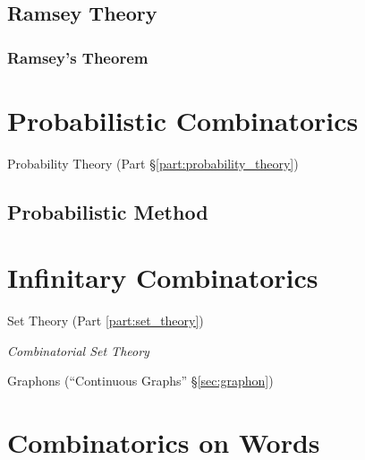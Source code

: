 \subsection{Ramsey Theory}\label{sec:ramsey_theory}

\subsubsection{Ramsey's Theorem}\label{sec:ramseys_theorem}



\section{Probabilistic Combinatorics}\label{sec:probabilistic_combinatorics}

Probability Theory (Part \S\ref{part:probability_theory})



\subsection{Probabilistic Method}\label{sec:probabilistic_method}



\section{Infinitary Combinatorics}\label{sec:infinitary_combinatorics}

Set Theory (Part \ref{part:set_theory})

\emph{Combinatorial Set Theory}

Graphons (``Continuous Graphs'' \S\ref{sec:graphon})



\section{Combinatorics on Words}\label{sec:combinatorics_on_words}

